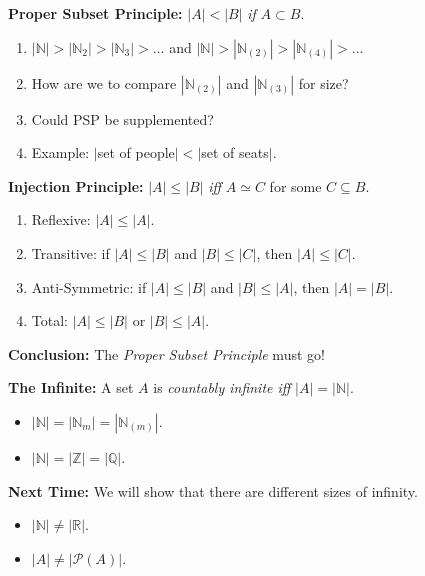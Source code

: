 \documentclass[handout]{beamer}
\newcommand{\abs}[1]{|#1|} %
\newcommand{\N}{\mathbb{N}}
\newcommand{\Z}{\mathbb{Z}}
\newcommand{\Q}{\mathbb{Q}}
\newcommand{\R}{\mathbb{R}}
\renewcommand{\P}{\mathcal{P}}
\begin{document}

\begin{frame}

  \textbf{Proper Subset Principle:} $\abs{A}<\abs{B}$ \textit{if} $A\subset B$.
  \pause

  \begin{enumerate}
    \item $\abs{\N}>\abs{\N_{2}}>\abs{\N_{3}}>\ldots$ and $\abs{\N}>\abs{\N_{(2)}}>\abs{\N_{(4)}}>\ldots$
    \item How are we to compare $\abs{\N_{(2)}}$ and $\abs{\N_{(3)}}$ for size?
    \item Could PSP be supplemented?
    \item Example: $|$set of people$| < |$set of seats$|$.
  \end{enumerate}
  \vspace{.2in}
  \pause

  \textbf{Injection Principle:} $\abs{A} \leq \abs{B}$ \textit{iff} $A \simeq C$ for some $C\subseteq B$. 
  \pause

  \begin{enumerate}
    \item Reflexive: $|A| \leq |A|$.
    \item Transitive: if $|A| \leq |B|$ and $|B| \leq |C|$, then $|A| \leq |C|$.
    \item Anti-Symmetric: if $|A| \leq |B|$ and $|B| \leq |A|$, then $|A| = |B|$.
    \item Total: $|A| \leq |B|$ or $|B| \leq |A|$.
  \end{enumerate}

\end{frame}


\begin{frame}

  \textbf{Conclusion:} The \textit{Proper Subset Principle} must go!
  \vspace{.2in}
  \pause

  \textbf{The Infinite:} A set $A$ is \textit{countably infinite iff} $\abs{A} = \abs{\N}$.

    \begin{itemize}
      \item $\abs{\N} = \abs{\N_m} = \abs{\N_{(m)}}$.  
      \item $\abs{\N} = \abs{\Z} = \abs{\Q}$.
    \end{itemize}
    \vspace{.2in}
    \pause

  \textbf{Next Time:} We will show that there are different sizes of infinity.

    \begin{itemize}
      \item $\abs{\N} \neq \abs{\R}$.
      \item $\abs{A} \neq \abs{\P(A)}$.
    \end{itemize}



\end{frame}
\end{document}

